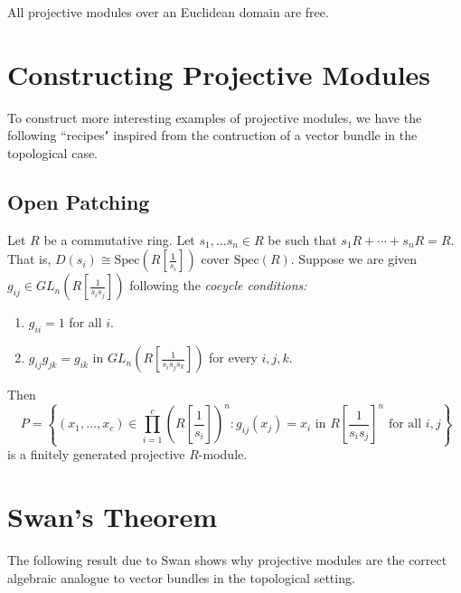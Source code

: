 \begin{proposition}
All projective modules over an Euclidean domain are free.
\end{proposition}


\section{Constructing Projective Modules}
To construct more interesting examples of projective modules, we have the following 
``recipes" inspired from the contruction of a vector bundle in the topological case.

\subsection{Open Patching}
Let $R$ be a commutative ring. Let $s_1, \ldots s_n \in R$ be such that 
$s_1R + \cdots + s_nR = R$. That is, $D(s_i) \cong \text{Spec}(R[\frac{1}{s_i}])$ cover $\text{Spec}(R)$.
Suppose we are given $g_{ij} \in GL_n(R[\frac{1}{s_is_j}])$ following the \emph{cocycle conditions:}

\begin{enumerate}
\item $g_{ii} = 1$ for all $i$.
  \item $g_{ij} g_{jk} = g_{ik}$ in $GL_n(R[\frac{1}{s_i s_j s_k}])$ for every $i,j,k$.
\end{enumerate}

Then 
\[
\  P = \left\{(x_1, \ldots, x_c) \in \prod\limits_{i = 1}^c \left(R\left[\frac{1}{s_i}\right]\right)^n : g_{ij}(x_j) = x_i \text{ in } R\left[\frac{1}{s_is_j}\right]^n \text{ for all } i, j\right\} 
\]
is a finitely generated projective $R$-module.


\section{Swan's Theorem}

The following result due to Swan \cite{Swan} shows why projective modules are the correct 
algebraic analogue to vector bundles in the topological setting. 

